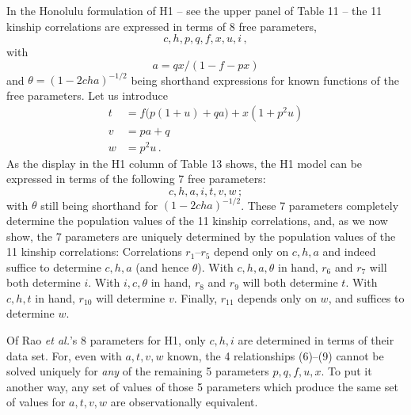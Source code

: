﻿\documentclass[12pt]{article}
\begin{document}
In the Honolulu formulation of H1 -- see the upper panel of Table 11 -- the 11 kinship correlations are expressed in terms of 8 free parameters,
\begin{equation*}
c, h, p, q, f, x, u, i \, ,
\end{equation*}
with
\begin{equation}
a = qx/(1-f-px) \tag{6}
\end{equation}
and $\theta = (1-2cha)^{-1/2}$ being shorthand expressions for known functions of the free parameters. Let us introduce
\begin{align}
t &= f\big(p(1+u)+qa\big) + x(1+p^2u) \tag{7} \\
v &= pa+q \tag{8} \\
w &= p^2u \, . \tag{9}
\end{align}
As the display in the H1 column of Table 13 shows, the H1 model can be expressed in terms of the following 7 free parameters:
\begin{equation*}
c, h, a, i, t, v, w \, ;
\end{equation*}
with $\theta$ still being shorthand for $(1-2cha)^{-1/2}$. These 7 parameters completely determine the population values of the 11 kinship correlations, and, as we now show, the 7 parameters are uniquely determined by the population values of the 11 kinship correlations: Correlations $r_1$--$r_5$ depend only on $c,h,a$ and indeed suffice to determine $c,h,a$ (and hence $\theta$). With $c,h,a,\theta$ in hand, $r_6$ and $r_7$ will both determine $i$. With $i,c,\theta$ in hand, $r_8$ and $r_9$ will both determine $t$. With $c,h,t$ in hand, $r_{10}$ will determine $v$. Finally, $r_{11}$ depends only on $w$, and suffices to determine $w$.

Of Rao \emph{et al.}'s 8 parameters for H1, only $c,h,i$ are determined in terms of their data set. For, even with $a,t,v,w$ known, the 4 relationships (6)--(9) cannot be solved uniquely for \emph{any} of the remaining 5 parameters $p,q,f,u,x$. To put it another way, any set of values of those 5 parameters which produce the same set of values for $a,t,v,w$ are observationally equivalent.
\end{document}
